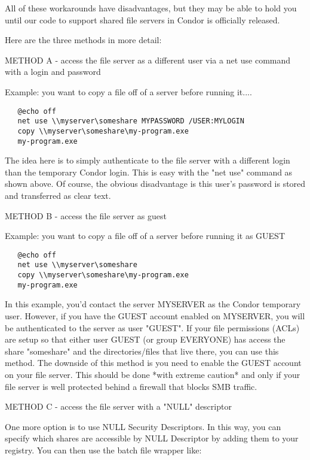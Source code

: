 All of these workarounds have disadvantages, but they may be able to hold 
you until our code to support shared file servers in Condor is officially 
released.

Here are the three methods in more detail:

METHOD A - access the file server as a different user via a net use command 
with a login and password

Example: you want to copy a file off of a server before running it....

\begin{verbatim}
   @echo off
   net use \\myserver\someshare MYPASSWORD /USER:MYLOGIN
   copy \\myserver\someshare\my-program.exe
   my-program.exe
\end{verbatim}

The idea here is to simply authenticate to the file server with a different 
login than the temporary Condor login.  This is easy with the "net use" 
command as shown above.  Of course, the obvious disadvantage is this user's 
password is stored and transferred as clear text.

METHOD B - access the file server as guest

Example: you want to copy a file off of a server before running it as GUEST

\begin{verbatim}
   @echo off
   net use \\myserver\someshare
   copy \\myserver\someshare\my-program.exe
   my-program.exe
\end{verbatim}

In this example, you'd contact the server MYSERVER as the Condor temporary 
user.  However, if you have the GUEST account enabled on MYSERVER, you will 
be authenticated to the server as user "GUEST".  If your file permissions 
(ACLs) are setup so that either user GUEST (or group EVERYONE) has access 
the share "someshare" and the directories/files that live there, you can 
use this method.  The downside of this method is you need to enable the 
GUEST account on your file server.   \Warn This should be done *with 
extreme caution* and only if your file server is well protected behind a 
firewall that blocks SMB traffic.

METHOD C - access the file server with a "NULL" descriptor

One more option is to use NULL Security Descriptors.  In this way, you
can specify which shares are accessible by NULL Descriptor by adding
them to your registry.  You can then use the batch file wrapper like:

